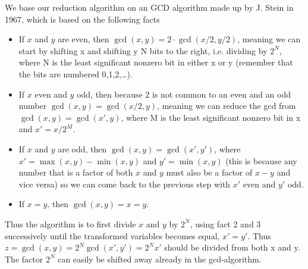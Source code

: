 We base our reduction algorithm on an GCD algorithm made up by J. Stein in 1967\cite{knuth}, which is based on the following facts
\begin{itemize}
\item If $x$ and $y$ are even, then $\gcd(x,y)=2\cdot\gcd(x/2,y/2)$, meaning we can start by shifting x and shifting y N bits to the right, i.e. dividing by $2^N$, where N is the least significant nonzero bit in either x or y (remember that the bits are numbered 0,1,2,\dots).
\item If $x$ even and $y$ odd, then because 2 is not common to an even and an odd number $\gcd(x,y)=\gcd(x/2,y)$, meaning we can reduce the gcd from $\gcd(x,y)=\gcd(x',y)$, where M is the least significant nonzero bit in x and $x'=x/2^M$.    
\item If $x$ and $y$ are odd, then $\gcd(x,y)=\gcd(x',y')$, where $x'=\max(x,y)-\min(x,y)$ and $y'=\min(x,y)$ (this is because any number that is a factor of both $x$ and $y$ must also be a factor of $x-y$ and vice versa) so we can come back to the previous step with $x'$ even and $y'$ odd. 
\item If $x = y$, then $\gcd(x,y) = x = y$. 
\end{itemize}
Thus the algorithm is to first divide $x$ and $y$ by $2^N$, using fact 2 and 3 successively until the transformed variables becomes equal, $x'=y'$. Thus $z=\gcd(x,y)=2^N\gcd(x',y')=2^Nx'$ should be divided from both x and y. The factor $2^N$ can easily be shifted away already in the gcd-algorithm.   

